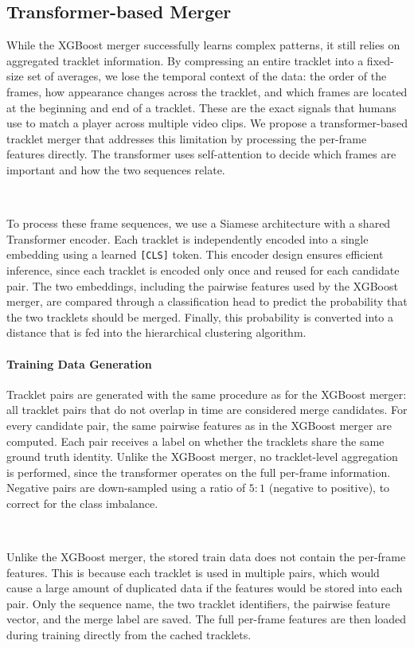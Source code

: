\subsection{Transformer-based Merger}
While the XGBoost merger successfully learns complex patterns, it still relies on aggregated tracklet information. By compressing an entire tracklet into a fixed-size set of averages, we lose the temporal context of the data: the order of the frames, how appearance changes across the tracklet, and which frames are located at the beginning and end of a tracklet. These are the exact signals that humans use to match a player across multiple video clips. We propose a transformer-based tracklet merger that addresses this limitation by processing the per-frame features directly. The transformer uses self-attention to decide which frames are important and how the two sequences relate.

\

To process these frame sequences, we use a Siamese architecture with a shared Transformer encoder. Each tracklet is independently encoded into a single embedding using a learned \texttt{[CLS]} token. This encoder design ensures efficient inference, since each tracklet is encoded only once and reused for each candidate pair. The two embeddings, including the pairwise features used by the XGBoost merger, are compared through a classification head to predict the probability that the two tracklets should be merged. Finally, this probability is converted into a distance that is fed into the hierarchical clustering algorithm.

\paragraph{Training Data Generation}
Tracklet pairs are generated with the same procedure as for the XGBoost merger: all tracklet pairs that do not overlap in time are considered merge candidates. For every candidate pair, the same pairwise features as in the XGBoost merger are computed. Each pair receives a label on whether the tracklets share the same ground truth identity. Unlike the XGBoost merger, no tracklet-level aggregation is performed, since the transformer operates on the full per-frame information. Negative pairs are down-sampled using a ratio of $5:1$ (negative to positive), to correct for the class imbalance.

\

Unlike the XGBoost merger, the stored train data does not contain the per-frame features. This is because each tracklet is used in multiple pairs, which would cause a large amount of duplicated data if the features would be stored into each pair. Only the sequence name, the two tracklet identifiers, the pairwise feature vector, and the merge label are saved. The full per-frame features are then loaded during training directly from the cached tracklets.


